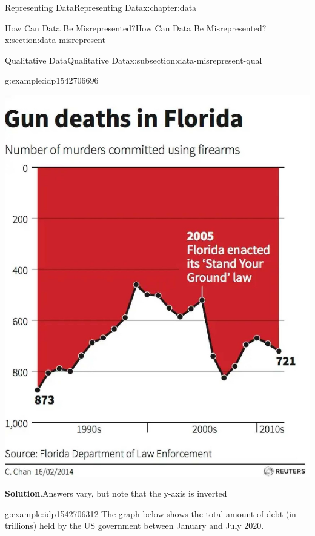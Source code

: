 \documentclass[oneside,10pt,]{book}
\newcommand{\blocktitlefont}{\relax}
\begin{document}
\begin{chapterptx}{Representing Data}{}{Representing Data}{}{}{x:chapter:data}
\begin{sectionptx}{How Can Data Be Misrepresented?}{}{How Can Data Be Misrepresented?}{}{}{x:section:data-misrepresent}
\begin{subsectionptx}{Qualitative Data}{}{Qualitative Data}{}{}{x:subsection:data-misrepresent-qual}
\begin{example}{}{g:example:idp1542706696}
\begin{image}{0.25}{0.5}{0.25}
\includegraphics[width=\linewidth]{external/fl_gun_deaths.jpg}
\end{image}%
%
\par\smallskip%
\noindent\textbf{\blocktitlefont Solution}.\hypertarget{g:solution:idp1542711048}{}\quad{}Answers vary, but note that the y-axis is inverted%
\end{example}
\begin{example}{}{g:example:idp1542706312}%
The graph below shows the total amount of debt (in trillions) held by the US government between January and July 2020.%
\par
\begin{image}{0}{1}{0}%
\end{image}
\end{example}
\end{subsectionptx}
\end{sectionptx}
\end{chapterptx}
\end{document}
